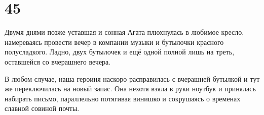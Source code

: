 \documentclass[
  a5paperpaper,
  DIV=11,
  numbers=noendperiod]{scrreprt}
\begin{document}
\section*{45}\label{45}


Двумя днями позже уставшая и сонная Агата плюхнулась в любимое кресло,
намереваясь провести вечер в компании музыки и бутылочки красного
полусладкого. Ладно, двух бутылочек и ещё одной полной лишь на треть,
оставшейся со вчерашнего вечера.

В любом случае, наша героиня наскоро расправилась с вчерашней бутылкой и
тут же переключилась на новый запас. Она нехотя взяла в руки ноутбук и
принялась набирать письмо, параллельно потягивая винишко и сокрушаясь о
временах славной совиной почты.
\end{document}
